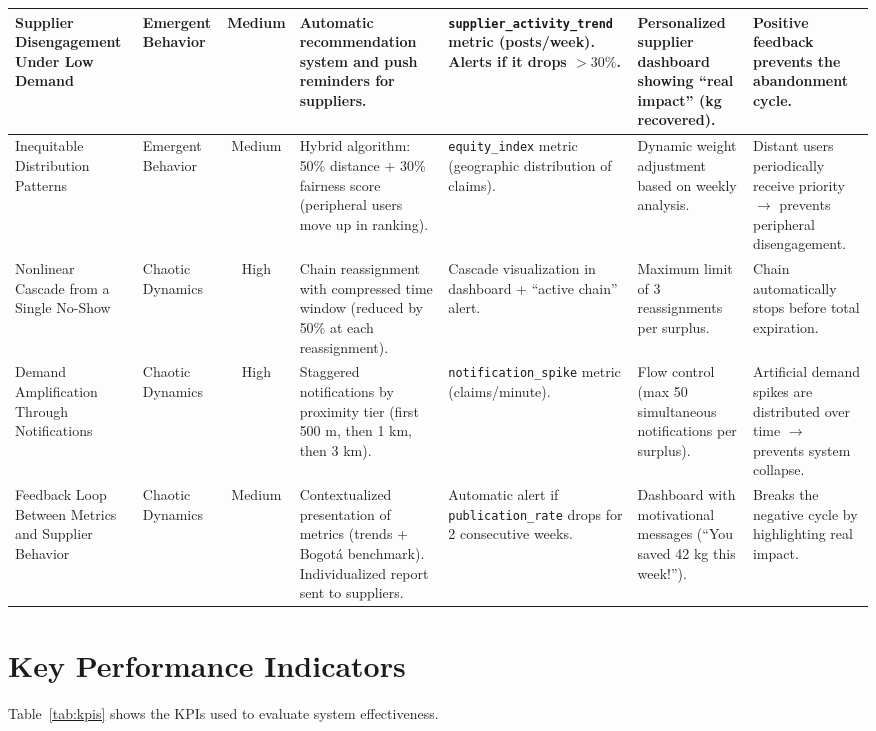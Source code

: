 \documentclass[conference]{IEEEtran}
\begin{document}
\begin{table}[!t]
{\begin{tabular}{p{1.8cm} p{1.2cm} c p{2.8cm} p{3.5cm} p{3.1cm} p{3.1cm}}
\midrule
Supplier Disengagement Under Low Demand & Emergent Behavior & Medium & Automatic recommendation system and push reminders for suppliers. & \texttt{supplier\_activity\_trend} metric (posts/week). Alerts if it drops $>30\%$. & Personalized supplier dashboard showing ``real impact'' (kg recovered). & Positive feedback prevents the abandonment cycle. \\
\midrule
Inequitable Distribution Patterns & Emergent Behavior & Medium & Hybrid algorithm: 50\% distance + 30\% fairness score (peripheral users move up in ranking). & \texttt{equity\_index} metric (geographic distribution of claims). & Dynamic weight adjustment based on weekly analysis. & Distant users periodically receive priority $\rightarrow$ prevents peripheral disengagement. \\
\midrule
Nonlinear Cascade from a Single No-Show & Chaotic Dynamics & High & Chain reassignment with compressed time window (reduced by 50\% at each reassignment). & Cascade visualization in dashboard + ``active chain'' alert. & Maximum limit of 3 reassignments per surplus. & Chain automatically stops before total expiration. \\
\midrule
Demand Amplification Through Notifications & Chaotic Dynamics & High & Staggered notifications by proximity tier (first 500 m, then 1 km, then 3 km). & \texttt{notification\_spike} metric (claims/minute). & Flow control (max 50 simultaneous notifications per surplus). & Artificial demand spikes are distributed over time $\rightarrow$ prevents system collapse. \\
\midrule
Feedback Loop Between Metrics and Supplier Behavior & Chaotic Dynamics & Medium & Contextualized presentation of metrics (trends + Bogotá benchmark). Individualized report sent to suppliers. & Automatic alert if \texttt{publication\_rate} drops for 2 consecutive weeks. & Dashboard with motivational messages (``You saved 42 kg this week!''). & Breaks the negative cycle by highlighting real impact. \\
\bottomrule
\end{tabular}
}

\end{table}

\section{Key Performance Indicators}
\label{app:kpis}

Table~\ref{tab:kpis} shows the KPIs used to evaluate system effectiveness.
\end{document}
